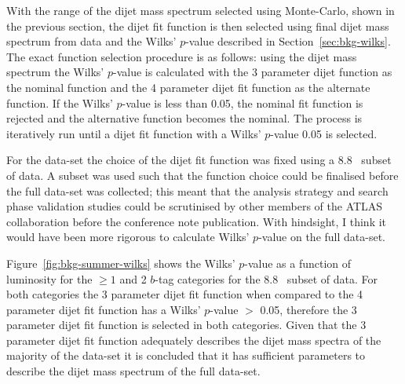With the range of the dijet mass spectrum selected using Monte-Carlo, shown in the previous section,
the dijet fit function is then selected using final dijet mass spectrum from data and the Wilks' $p$-value described in Section~\ref{sec:bkg-wilks}.
The exact function selection procedure is as follows:
using the dijet mass spectrum the  Wilks' \mbox{$p$-value} is calculated with
the 3 parameter dijet function as the nominal function and the 4 parameter dijet fit function as the alternate function.
If the Wilks' \mbox{$p$-value} is less than 0.05, the nominal fit function is rejected and the alternative function becomes the nominal.
The process is iteratively run until a dijet fit function with a Wilks' \mbox{$p$-value} \gt{} 0.05 is selected.

For the \summer{} data-set the choice of the dijet fit function was fixed using a 8.8~\ifb{} subset of data.
A subset was used such that the function choice could be finalised before the full data-set was collected;
this meant that the analysis strategy and search phase validation studies could be scrutinised by other members of the ATLAS collaboration before the conference note publication.
With hindsight, I think it would have been more rigorous to calculate Wilks' \mbox{$p$-value} on the full data-set.

Figure~\ref{fig:bkg-summer-wilks} shows the Wilks' \mbox{$p$-value} as a function of luminosity
for the $\geq1$ and 2 \mbox{$b$-tag} categories for the 8.8~\ifb{} subset of data.
For both categories the 3 parameter dijet fit function when compared to the 4 parameter dijet fit function
has a Wilks' \mbox{$p$-value} $>$ 0.05,
therefore the 3 parameter dijet fit function is selected in both categories.
Given that the 3 parameter dijet fit function adequately describes the dijet mass spectra of the
majority of the data-set it is concluded that it has sufficient parameters to describe the dijet mass spectrum of the full data-set.

